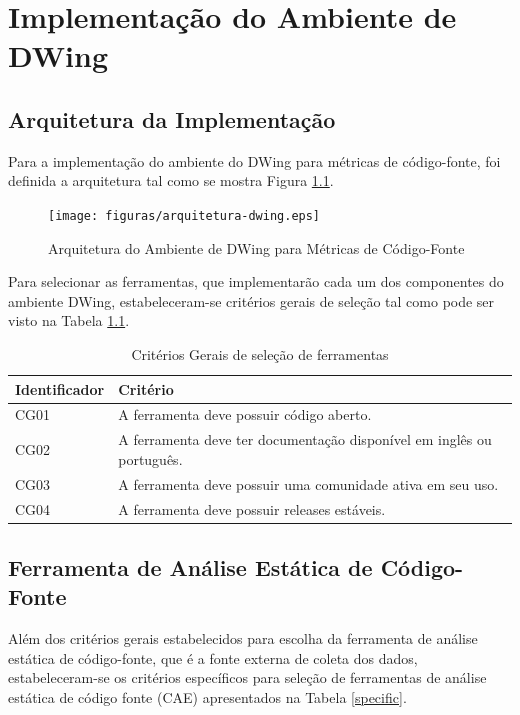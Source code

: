 \chapter{Implementação do Ambiente de DWing}
\label{estudo de caso}

\section{Arquitetura da Implementação}

Para a implementação do ambiente do DWing para métricas de código-fonte, foi definida a arquitetura tal como se mostra Figura \ref{arquitetura}.


\begin{figure}[ht!]
\centering
\texttt{[image: figuras/arquitetura-dwing.eps]}
\caption{Arquitetura do Ambiente de DWing para Métricas de Código-Fonte}
\label{arquitetura}
\end{figure}
\FloatBarrier

Para selecionar as ferramentas, que implementarão cada um dos componentes do ambiente DWing, estabeleceram-se critérios gerais de seleção tal como pode ser visto na Tabela \ref{seleção}.


	\begin{table}[!ht]
	\begin{center}
	 \begin{tabular}{|l|l|}
		\hline
		Identificador & Critério 
		\\ \hline
		CG01 & A ferramenta deve possuir código aberto.  
		\\ \hline
		CG02 & A ferramenta deve ter documentação disponível em inglês ou português.      
		\\ \hline
		CG03 & A ferramenta deve possuir uma comunidade ativa em seu uso.
		\\ \hline
		CG04 & A ferramenta deve possuir releases estáveis.    
		\\ \hline
		\end{tabular}
		\caption{Critérios Gerais de seleção de ferramentas}
		\label{seleção}
		\end{center}
		\end{table}	


\section{Ferramenta de Análise Estática de Código-Fonte}

Além dos critérios gerais estabelecidos para escolha da ferramenta de análise estática de código-fonte, que é a fonte externa de coleta dos dados, estabeleceram-se os critérios específicos para seleção de ferramentas de análise estática de código fonte (CAE) apresentados na Tabela \ref{specific}.


